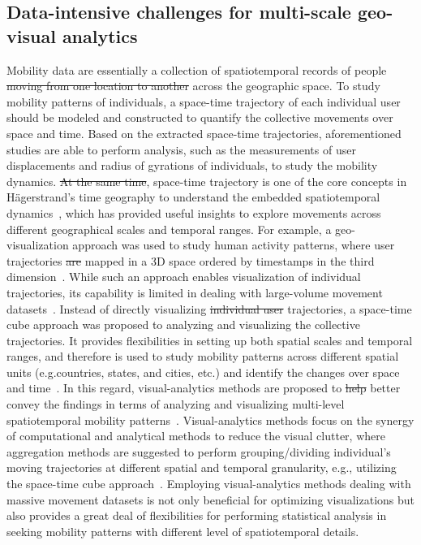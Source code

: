 \documentclass[ijgi,article,submit,moreauthors,pdftex,10pt,a4paper]{mdpi}
\theoremstyle{mdpi}
\newcounter{ex}
\newcounter{re}
\theoremstyle{mdpidefinition}
\providecommand{\DIFadd}[1]{{\protect\color{blue}\uwave{#1}}} %
\providecommand{\DIFdel}[1]{{\protect\color{red}\sout{#1}}}                      %
\providecommand{\DIFaddbegin}{} %
\providecommand{\DIFaddend}{} %
\providecommand{\DIFdelbegin}{} %
\providecommand{\DIFdelend}{} %
\begin{document}
\subsection{Data-intensive challenges for multi-scale geo-visual analytics}
Mobility data are essentially a collection of spatiotemporal records of people \DIFdelbegin \DIFdel{moving from one location to another }\DIFdelend \DIFaddbegin \DIFadd{re-allocating }\DIFaddend across the geographic space.
To study mobility patterns of individuals, a space-time trajectory of each individual user should be modeled and constructed to quantify the collective movements over space and time.
Based on the extracted space-time trajectories, aforementioned studies are able to perform analysis, such as the measurements of user displacements and radius of gyrations of individuals, to study the mobility dynamics.
\DIFdelbegin \DIFdel{At the same time}\DIFdelend \DIFaddbegin \DIFadd{Indeed}\DIFaddend , space-time trajectory is one of the core concepts in H{\"a}gerstrand's time geography to understand the embedded spatiotemporal dynamics~\cite{hagerstrand1985time}, which has provided useful insights to explore movements across different geographical scales and temporal ranges.
For example, a geo-visualization approach was used to study human activity patterns, where user trajectories \DIFdelbegin \DIFdel{are }\DIFdelend \DIFaddbegin \DIFadd{were }\DIFaddend mapped in a 3D space ordered by timestamps in the third dimension~\cite{kwan2004geovisualization}.
While such an approach enables visualization of individual trajectories, its capability is limited in dealing with large-volume movement datasets~\cite{andrienko2007designing}.
Instead of directly visualizing \DIFdelbegin \DIFdel{individual user }\DIFdelend \DIFaddbegin \DIFadd{an individual user's }\DIFaddend trajectories, a space-time cube approach was proposed to analyzing and visualizing the collective trajectories.
It provides flexibilities in setting up both spatial scales and temporal ranges, and therefore is used to study mobility patterns across different spatial units (e.g.\DIFaddbegin \DIFadd{, }\DIFaddend countries, states, and cities, etc.) and identify the changes over space and time~\cite{maceachren2001research, maceachren2004maps}.
In this regard, visual-analytics methods are proposed to \DIFdelbegin \DIFdel{help }\DIFdelend better convey the findings in terms of analyzing and visualizing multi-level spatiotemporal mobility patterns~\cite{andrienko2007designing,andrienko2007visual}.
Visual-analytics methods focus on the synergy of computational and analytical methods to reduce the visual clutter, where aggregation methods are suggested to perform grouping/dividing individual's moving trajectories at different spatial and temporal granularity, e.g., utilizing the space-time cube approach~\cite{andrienko2007designing}.
Employing visual-analytics methods dealing with massive movement datasets is not only beneficial for optimizing visualizations but also provides a great deal of flexibilities for performing statistical analysis in seeking mobility patterns with different level of spatiotemporal details. 
\end{document}
